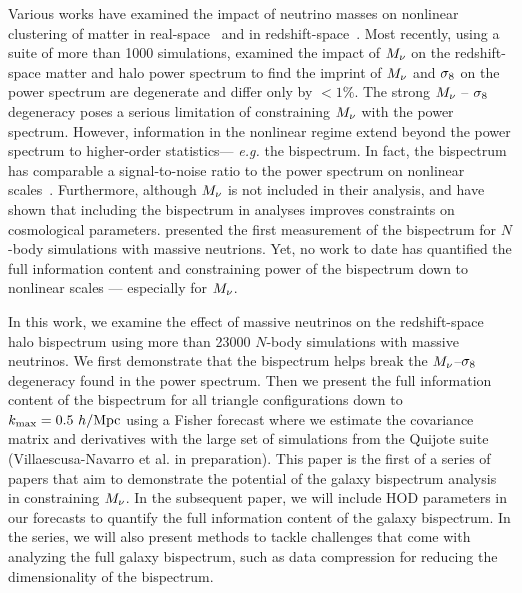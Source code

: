 Various works have examined the impact of neutrino masses on nonlinear clustering 
of matter in real-space~\citep[\emph{e.g.}][]{brandyge2008, saito2008, wong2008, saito2009, viel2010, agarwal2011} and in 
redshift-space~\citep{marulli2011, castorina2015, upadhye2016}. Most recently, 
using a suite of more than 1000 simulations, \cite{villaescusa-navarro2018} 
examined the impact of $M_\nu$ on the redshift-space matter and halo power 
spectrum to find the imprint of $M_\nu$ and $\sigma_8$ on the power spectrum are 
degenerate and differ only by $< 1\%$. The strong $M_\nu$ -- $\sigma_8$ degeneracy
poses a serious limitation of constraining $M_\nu$ with the power spectrum. 
However, information in the nonlinear regime extend beyond the power spectrum 
to higher-order statistics--- \emph{e.g.} the bispectrum. In fact, the 
bispectrum has comparable a signal-to-noise ratio to the power spectrum
on nonlinear scales~\citep{sefusatti2005, chan2017}. Furthermore, although $M_\nu$ 
is not included in their analysis, \cite{sefusatti2006} and \cite{yankelevich2019} 
have shown that including the bispectrum in analyses improves constraints on 
cosmological parameters. \cite{ruggeri2018} presented the first measurement of 
the bispectrum for $N$-body simulations with massive neutrions. Yet, no work to 
date has quantified the full information content and constraining power of 
the bispectrum down to nonlinear scales --- especially for $M_\nu$. 

In this work, we examine the effect of massive neutrinos on the redshift-space 
halo bispectrum using more than 23000 $N$-body simulations with massive neutrinos. 
We first demonstrate that the bispectrum helps break the $M_\nu$--$\sigma_8$ degeneracy 
found in the power spectrum. Then we present the full information content of the 
bispectrum for all triangle configurations down to $k_{\rm max} = 0.5~h/{\rm Mpc}$ using 
a Fisher forecast where we estimate the covariance matrix and derivatives with 
the large set of simulations from the Quijote suite (Villaescusa-Navarro et al. in preparation). 
This paper is the first of a series of papers that aim to demonstrate the potential 
of the galaxy bispectrum analysis in constraining $M_\nu$. In the subsequent paper, 
we will include HOD parameters in our forecasts to quantify the full information 
content of the galaxy bispectrum. In the series, we will also present methods to 
tackle challenges that come with analyzing the full galaxy bispectrum, such as data 
compression for reducing the dimensionality of the bispectrum. 

